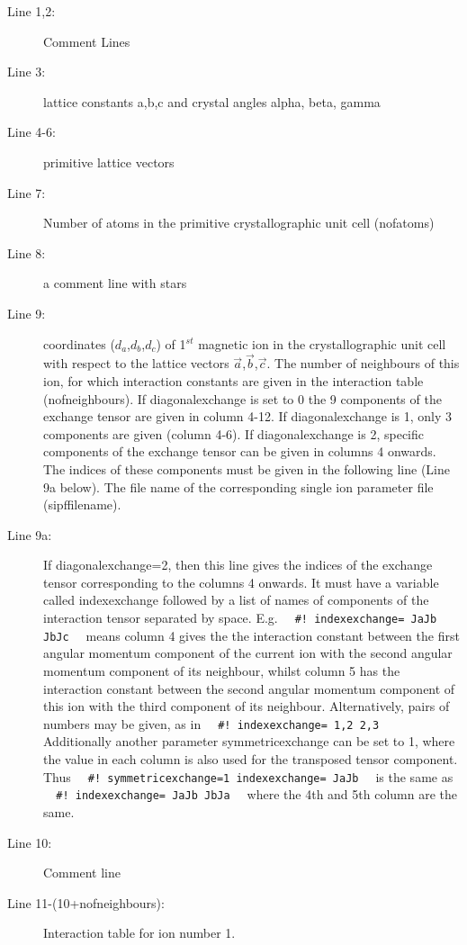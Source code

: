 \begin{description}
\item [Line 1,2:] Comment Lines
\item [Line 3:] lattice constants a,b,c and crystal angles alpha, beta, gamma 
\item [Line 4-6:] primitive lattice vectors
\item [Line 7:] Number of atoms in the primitive crystallographic unit cell ({\prg nofatoms})
\item [Line 8:] a comment line with stars
\item [Line 9:] coordinates  ($d_a$,$d_b$,$d_c$) of 1$^{st}$ magnetic ion in the crystallographic unit cell  with
respect to the lattice vectors $\vec a$,$\vec b$,$\vec c$. The number of neighbours of this 
ion, for which interaction constants are given in the interaction table (nofneighbours). 
If {\prg diagonalexchange}
is set to 0 the 9 components of the exchange tensor are given in column 4-12. 
If {\prg diagonalexchange}
 is 1, only 3 components are given (column 4-6).
If {\prg diagonalexchange}
 is 2, specific components of the exchange tensor can be given in columns 4 onwards. The indices of these components
 must be given in the following line (Line 9a below).
The file name of the corresponding single ion
parameter file (sipffilename).
\item [Line 9a:]  If {\prg diagonalexchange=2}, then this line gives the indices of the exchange tensor corresponding to 
 the columns 4 onwards. It must have a variable called {\prg indexexchange} followed by a list of names of components of the interaction
 tensor separated by space. E.g.
 \verb|  #! indexexchange= JaJb JbJc  | 
means column 4 gives the the interaction constant between the
 first angular momentum component of the current ion with the second angular momentum component of its neighbour, whilst 
 column 5 has the interaction constant between the second angular momentum component of this ion with the third component of its
 neighbour. Alternatively, pairs of numbers may be given, as in \verb|  #! indexexchange= 1,2 2,3  |
 Additionally another parameter {\prg symmetricexchange} can be set to 1, where the value in each column is also used 
 for the transposed tensor component. Thus \verb|  #! symmetricexchange=1 indexexchange= JaJb  | is the same as \\
 \verb|  #! indexexchange= JaJb JbJa  | where the 4th and 5th column are the same.
\item [Line 10:]  Comment line
\item [Line 11-(10+nofneighbours):] Interaction table for ion number 1.   

\end{description}
